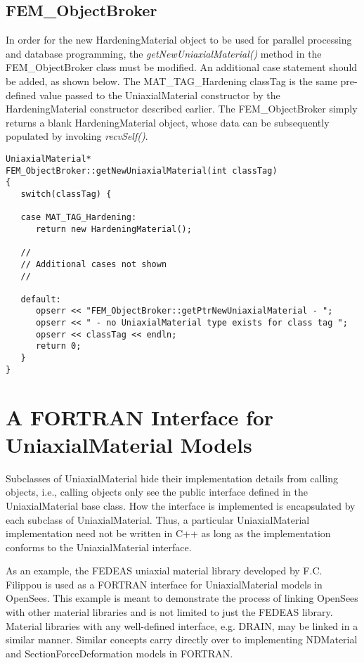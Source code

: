 \documentclass[12pt]{article}
\begin{document}
\subsection{FEM\_ObjectBroker}
In order for the new HardeningMaterial object to be used for parallel processing and
database programming, the {\em getNewUniaxialMaterial()} method in the FEM\_ObjectBroker
class must be modified. An additional case statement should be added, as shown below.
The MAT\_TAG\_Hardening classTag is the same pre-defined value passed to the
UniaxialMaterial constructor by the HardeningMaterial constructor described earlier.
The FEM\_ObjectBroker simply returns a blank HardeningMaterial object, whose data
can be subsequently populated by invoking {\em recvSelf()}.

{\sf\small
\begin{verbatim}
UniaxialMaterial*
FEM_ObjectBroker::getNewUniaxialMaterial(int classTag)
{
   switch(classTag) {

   case MAT_TAG_Hardening:
      return new HardeningMaterial();

   //
   // Additional cases not shown
   //

   default:
      opserr << "FEM_ObjectBroker::getPtrNewUniaxialMaterial - ";
      opserr << " - no UniaxialMaterial type exists for class tag ";
      opserr << classTag << endln;
      return 0;
   }        
}
\end{verbatim}
}

\section{A FORTRAN Interface for UniaxialMaterial Models}
Subclasses of UniaxialMaterial hide their implementation details from calling
objects, i.e., calling objects only see the public interface defined in the UniaxialMaterial
base class. How the interface is implemented is encapsulated by each subclass
of UniaxialMaterial. Thus, a particular UniaxialMaterial implementation
need not be written in C++ as long as the implementation conforms to the UniaxialMaterial
interface.

As an example, the FEDEAS uniaxial material library developed by F.C. Filippou
is used as a FORTRAN interface for
UniaxialMaterial models in OpenSees. This example is meant to demonstrate the process
of linking OpenSees with other material libraries and is not limited to just the
FEDEAS library. Material libraries with any well-defined interface, e.g. DRAIN, may
be linked in a similar manner. Similar concepts carry directly over to
implementing NDMaterial and SectionForceDeformation models in FORTRAN.
\end{document}

